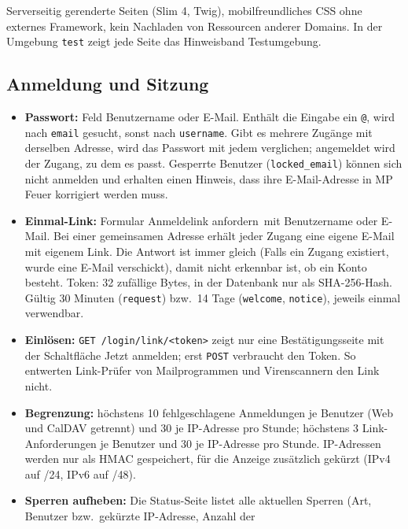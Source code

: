 \documentclass[a4paper,fontsize=10pt]{scrartcl}
\newcommand{\code}[1]{\texttt{#1}}
\begin{document}
Serverseitig gerenderte Seiten (Slim 4, Twig), mobilfreundliches CSS ohne
externes Framework, kein Nachladen von Ressourcen anderer Domains. In der
Umgebung \code{test} zeigt jede Seite das Hinweisband
\glqq Testumgebung\grqq.

\subsection{Anmeldung und Sitzung}\label{sec:anmeldung}

\begin{itemize}
  \item \textbf{Passwort:} Feld \glqq Benutzername oder E-Mail\grqq. Enthält
        die Eingabe ein \code{@}, wird nach \code{email} gesucht, sonst nach
        \code{username}. Gibt es mehrere Zugänge mit derselben Adresse, wird
        das Passwort mit jedem verglichen; angemeldet wird der Zugang, zu dem
        es passt. Gesperrte Benutzer (\code{locked\_email}) können
        sich nicht anmelden und erhalten einen Hinweis, dass ihre
        E-Mail-Adresse in MP Feuer korrigiert werden muss.
  \item \textbf{Einmal-Link:} Formular \glqq Anmeldelink anfordern\grqq\ mit
        Benutzername oder E-Mail. Bei einer gemeinsamen Adresse erhält jeder
        Zugang eine eigene E-Mail mit eigenem Link. Die Antwort ist immer
        gleich (\glqq Falls ein Zugang existiert, wurde eine E-Mail
        verschickt\grqq), damit nicht erkennbar ist, ob ein Konto besteht.
        Token: 32 zufällige Bytes, in der Datenbank nur als SHA-256-Hash.
        Gültig 30 Minuten (\code{request}) bzw.\ 14 Tage (\code{welcome},
        \code{notice}), jeweils einmal verwendbar.
  \item \textbf{Einlösen:} \code{GET /login/link/<token>} zeigt nur eine
        Bestätigungsseite mit der Schaltfläche \glqq Jetzt anmelden\grqq;
        erst \code{POST} verbraucht den Token. So entwerten Link-Prüfer von
        Mailprogrammen und Virenscannern den Link nicht.
  \item \textbf{Begrenzung:} höchstens 10 fehlgeschlagene Anmeldungen je
        Benutzer (Web und CalDAV getrennt) und 30 je IP-Adresse pro Stunde;
        höchstens 3 Link-Anforderungen je Benutzer und 30 je IP-Adresse pro
        Stunde. IP-Adressen werden nur als HMAC gespeichert, für die Anzeige
        zusätzlich gekürzt (IPv4 auf /24, IPv6 auf /48).
  \item \textbf{Sperren aufheben:} Die Status-Seite listet alle aktuellen
        Sperren (Art, Benutzer bzw.\ gekürzte IP-Adresse, Anzahl der

\end{itemize}
\end{document}
